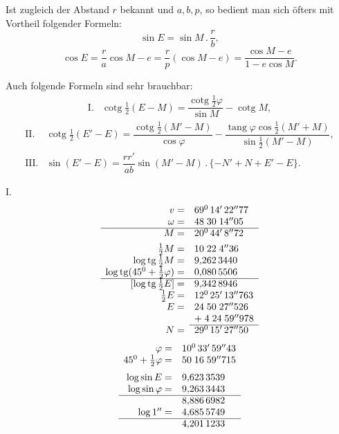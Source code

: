 Ist zugleich der Abstand $r$ bekannt und $a,b,p$, so bedient man sich öfters mit Vortheil folgender Formeln:
\[
\sin E=\sin M\mathbin{.}\frac rb,
\]
\[
\cos E=\frac ra\cos M-e=\frac rp(\cos M-e)=\frac{\cos M-e}{1-e\cos M}.
\]
\noindent{\small [S. 12]}\par\noindent Auch folgende Formeln sind sehr brauchbar:
\[
\begin{array}{rl}
\mathrm{I.}&\operatorname{cotg}\tfrac12(E-M)=\dfrac{\operatorname{cotg}\tfrac12\varphi}{\sin M}-\operatorname{cotg}M,
\end{array}
\]
\clearpage
{}
\[
\begin{array}{rl}
\mathrm{II.}&\operatorname{cotg}\tfrac12(E'-E)=\dfrac{\operatorname{cotg}\tfrac12(M'-M)}{\cos\varphi}
-\dfrac{\operatorname{tang}\varphi\cos\tfrac12(M'+M)}{\sin\tfrac12(M'-M)},\\[6pt]
\mathrm{III.}&\sin(E'-E)=\dfrac{rr'}{ab}\sin(M'-M)\mathbin{.}\{-N'+N+E'-E\}.
\end{array}
\]
\begin{center}\end{center}
\noindent I.
\[
\begin{array}{rl}
v=&69^0\,14'\,22''77\\
\omega=&48\;30\;14''05\\\cline{1-2}
M=&20^0\,44'\,8''72\\[4pt]
\tfrac12M=&10\;22\;4''36\\
\log\operatorname{tg}\tfrac12M=&9{,}262\,3440\\
\log\operatorname{tg}(45^0+\tfrac12\varphi)=&0{,}080\,5506\\\cline{1-2}
{}[\log\operatorname{tg}\tfrac12E]=&9{,}342\,8946\\
\tfrac12E=&12^0\,25'\,13''763\\
E=&24\;50\;27''526\\
&+\;4\;24\;59''978\\\cline{2-2}
N=&29^0\,15'\,27''50
\end{array}
\]
\[
\begin{array}{rl}
\varphi=&10^0\,33'\,59''43\\
45^0+\tfrac12\varphi=&50\;16\;59''715\\[6pt]
\log\sin E=&9{,}623\,3539\\
\log\sin\varphi=&9{,}263\,3443\\\cline{1-2}
&8{,}886\,6982\\
\log1''=&4{,}685\,5749\\\cline{1-2}
&4{,}201\,1233
\end{array}
\]
